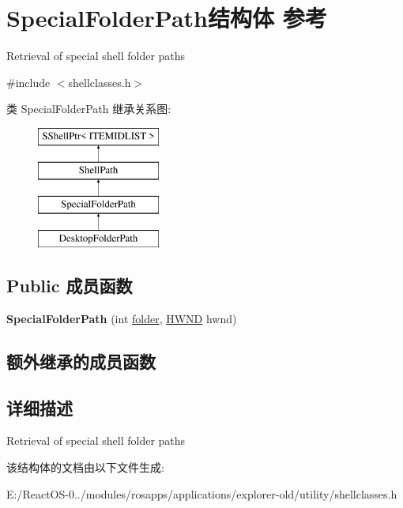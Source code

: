 \hypertarget{struct_special_folder_path}{}\section{Special\+Folder\+Path结构体 参考}
\label{struct_special_folder_path}


Retrieval of special shell folder paths  




{\ttfamily \#include $<$shellclasses.\+h$>$}

类 Special\+Folder\+Path 继承关系图\+:\begin{figure}[H]
\begin{center}
\leavevmode
\includegraphics[height=4.000000cm]{struct_special_folder_path}
\end{center}
\end{figure}
\subsection*{Public 成员函数}
\begin{DoxyCompactItemize}
\item 
\mbox{\label{struct_special_folder_path_aeddf1e729002dd1fd91a600f365ac75d}} 
{\bfseries Special\+Folder\+Path} (int \hyperlink{structfolder}{folder}, \hyperlink{interfacevoid}{H\+W\+ND} hwnd)
\end{DoxyCompactItemize}
\subsection*{额外继承的成员函数}


\subsection{详细描述}
Retrieval of special shell folder paths 

该结构体的文档由以下文件生成\+:\begin{DoxyCompactItemize}
\item 
E\+:/\+React\+O\+S-\/0../modules/rosapps/applications/explorer-\/old/utility/shellclasses.\+h\end{DoxyCompactItemize}
